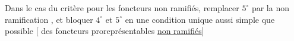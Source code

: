 Dans le cas du critère pour les foncteurs non ramifiés, remplacer $5^\circ$ par la non ramification , et bloquer $4^\circ$ et $5^\circ$ en une condition unique aussi simple que possible [ des foncteurs proreprésentables \uline{non ramifiés}]
